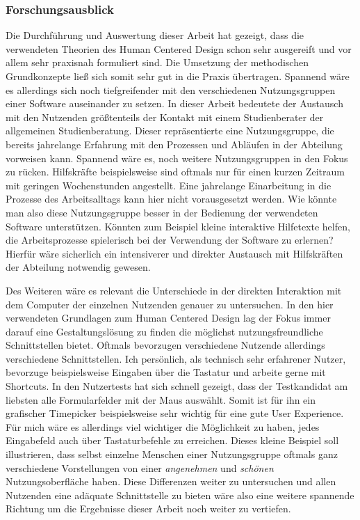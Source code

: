 \subsubsection{Forschungsausblick}
Die Durchführung und Auswertung dieser Arbeit hat gezeigt, dass die verwendeten
Theorien des Human Centered Design schon sehr ausgereift und vor allem sehr
praxisnah formuliert sind. Die Umsetzung der methodischen Grundkonzepte ließ
sich somit sehr gut in die Praxis übertragen. Spannend wäre es allerdings sich
noch tiefgreifender mit den verschiedenen Nutzungsgruppen einer Software
auseinander zu setzen. In dieser Arbeit bedeutete der Austausch mit den
Nutzenden größtenteils der Kontakt mit einem Studienberater der allgemeinen
Studienberatung. Dieser repräsentierte eine Nutzungsgruppe, die bereits
jahrelange Erfahrung mit den Prozessen und Abläufen in der Abteilung vorweisen
kann. Spannend wäre es, noch weitere Nutzungsgruppen in den Fokus zu rücken.
Hilfskräfte beispielsweise sind oftmals nur für einen kurzen Zeitraum mit
geringen Wochenstunden angestellt. Eine jahrelange Einarbeitung in die Prozesse
des Arbeitsalltags kann hier nicht vorausgesetzt werden. Wie könnte man also
diese Nutzungsgruppe besser in der Bedienung der verwendeten Software
unterstützen. Könnten zum Beispiel kleine interaktive Hilfetexte helfen, die
Arbeitsprozesse spielerisch bei der Verwendung der Software zu erlernen?
Hierfür wäre sicherlich ein intensiverer und direkter Austausch mit
Hilfskräften der Abteilung notwendig gewesen.

Des Weiteren wäre es relevant die Unterschiede in der direkten Interaktion mit
dem Computer der einzelnen Nutzenden genauer zu untersuchen. In den hier
verwendeten Grundlagen zum Human Centered Design lag der Fokus immer darauf
eine Gestaltungslösung zu finden die möglichst nutzungsfreundliche
Schnittstellen bietet.\cite{hcd} Oftmals bevorzugen verschiedene Nutzende
allerdings verschiedene Schnittstellen. Ich persönlich, als technisch sehr
erfahrener Nutzer, bevorzuge beispielsweise Eingaben über die Tastatur und
arbeite gerne mit Shortcuts. In den Nutzertests hat sich schnell gezeigt, dass
der Testkandidat am liebsten alle Formularfelder mit der Maus auswählt. Somit
ist für ihn ein grafischer Timepicker beispielsweise sehr wichtig für eine gute
User Experience. Für mich wäre es allerdings viel wichtiger die Möglichkeit zu
haben, jedes Eingabefeld auch über Tastaturbefehle zu erreichen. Dieses kleine
Beispiel soll illustrieren, dass selbst einzelne Menschen einer Nutzungsgruppe
oftmals ganz verschiedene Vorstellungen von einer \textit{angenehmen} und
\textit{schönen} Nutzungsoberfläche haben. Diese Differenzen weiter zu
untersuchen und allen Nutzenden eine adäquate Schnittstelle zu bieten wäre also
eine weitere spannende Richtung um die Ergebnisse dieser Arbeit noch weiter zu
vertiefen.